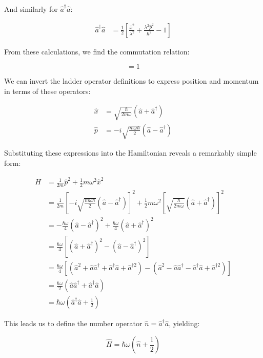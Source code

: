 \documentclass[10pt]{article}
\begin{document}
And similarly for $\hat{a}^\dagger\hat{a}$:

\begin{align*}
\hat{a}^\dagger\hat{a} &= \frac{1}{2}\left[\frac{\hat{x}^2}{\lambda^2} + \frac{\lambda^2\hat{p}^2}{\hbar^2} - 1\right] \tag{5.9}
\end{align*}

From these calculations, we find the commutation relation:

\begin{equation*}
[a,a^\dagger] = 1 \tag{5.10}
\end{equation*}

We can invert the ladder operator definitions to express position and momentum in terms of these operators:

\begin{align*}
\hat{x} &= \sqrt{\frac{\hbar}{2m\omega}}(\hat{a} + \hat{a}^\dagger) \\
\hat{p} &= -i\sqrt{\frac{m\omega\hbar}{2}}(\hat{a} - \hat{a}^\dagger) \tag{5.11}
\end{align*}

Substituting these expressions into the Hamiltonian reveals a remarkably simple form:

\begin{align*}
\hat{H} &= \frac{1}{2m}\hat{p}^2 + \frac{1}{2}m\omega^2\hat{x}^2 \\
&= \frac{1}{2m}\left[-i\sqrt{\frac{m\omega\hbar}{2}}(\hat{a} - \hat{a}^\dagger)\right]^2 + \frac{1}{2}m\omega^2\left[\sqrt{\frac{\hbar}{2m\omega}}(\hat{a} + \hat{a}^\dagger)\right]^2 \\
&= -\frac{\hbar\omega}{4}(\hat{a} - \hat{a}^\dagger)^2 + \frac{\hbar\omega}{4}(\hat{a} + \hat{a}^\dagger)^2 \\
&= \frac{\hbar\omega}{4}[(\hat{a} + \hat{a}^\dagger)^2 - (\hat{a} - \hat{a}^\dagger)^2] \tag{5.12} \\
&= \frac{\hbar\omega}{4}[(\hat{a}^2 + \hat{a}\hat{a}^\dagger + \hat{a}^\dagger\hat{a} + \hat{a}^{\dagger2}) - (\hat{a}^2 - \hat{a}\hat{a}^\dagger - \hat{a}^\dagger\hat{a} + \hat{a}^{\dagger2})] \\
&= \frac{\hbar\omega}{2}(\hat{a}\hat{a}^\dagger + \hat{a}^\dagger\hat{a}) \\
&= \hbar\omega\left(\hat{a}^\dagger\hat{a} + \frac{1}{2}\right)
\end{align*}

This leads us to define the number operator $\hat{n} = \hat{a}^\dagger\hat{a}$, yielding:

\begin{equation*}
\hat{H} = \hbar\omega\left(\hat{n} + \frac{1}{2}\right) \tag{5.13}
\end{equation*}
\end{document}

